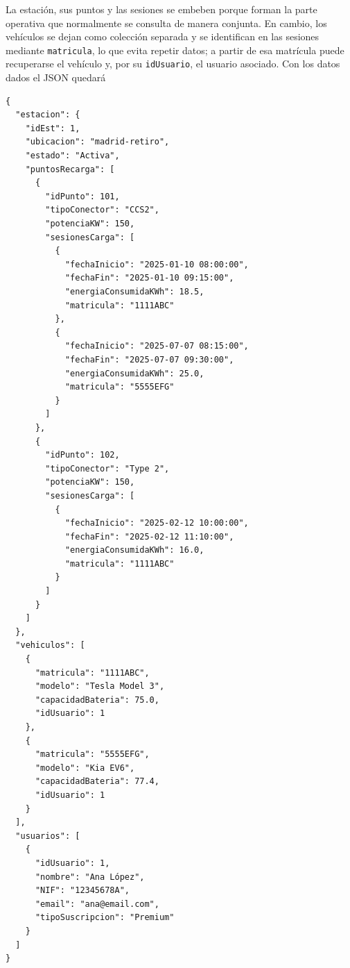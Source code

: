 \documentclass[10pt,a4paper,addpoints,answers]{exam}
\begin{document}
\begin{questions}
\vspace{1em}

\begin{solution}[12em]
La estación, sus puntos y las sesiones se embeben porque forman la parte operativa que normalmente se consulta de manera conjunta. 
En cambio, los vehículos se dejan como colección separada y se identifican en las sesiones mediante \texttt{matricula}, lo que evita repetir datos; a partir de esa matrícula puede recuperarse el vehículo y, por su \texttt{idUsuario}, el usuario asociado. Con los datos dados el JSON quedará

\begin{verbatim}
{
  "estacion": {
    "idEst": 1,
    "ubicacion": "madrid-retiro",
    "estado": "Activa",
    "puntosRecarga": [
      {
        "idPunto": 101,
        "tipoConector": "CCS2",
        "potenciaKW": 150,
        "sesionesCarga": [
          {
            "fechaInicio": "2025-01-10 08:00:00",
            "fechaFin": "2025-01-10 09:15:00",
            "energiaConsumidaKWh": 18.5,
            "matricula": "1111ABC"
          },
          {
            "fechaInicio": "2025-07-07 08:15:00",
            "fechaFin": "2025-07-07 09:30:00",
            "energiaConsumidaKWh": 25.0,
            "matricula": "5555EFG"
          }
        ]
      },
      {
        "idPunto": 102,
        "tipoConector": "Type 2",
        "potenciaKW": 150,
        "sesionesCarga": [
          {
            "fechaInicio": "2025-02-12 10:00:00",
            "fechaFin": "2025-02-12 11:10:00",
            "energiaConsumidaKWh": 16.0,
            "matricula": "1111ABC"
          }
        ]
      }
    ]
  },
  "vehiculos": [
    {
      "matricula": "1111ABC",
      "modelo": "Tesla Model 3",
      "capacidadBateria": 75.0,
      "idUsuario": 1
    },
    {
      "matricula": "5555EFG",
      "modelo": "Kia EV6",
      "capacidadBateria": 77.4,
      "idUsuario": 1
    }
  ],
  "usuarios": [
    {
      "idUsuario": 1,
      "nombre": "Ana López",
      "NIF": "12345678A",
      "email": "ana@email.com",
      "tipoSuscripcion": "Premium"
    }
  ]
}
\end{verbatim}
\end{solution}

\end{questions}
\end{document}
